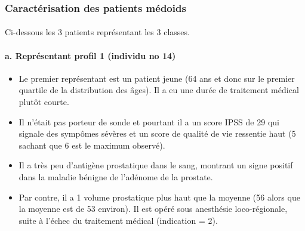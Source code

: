 \documentclass[11pt]{article}
\providecommand{\tightlist}{%
      \setlength{\itemsep}{0pt}\setlength{\parskip}{0pt}}
\begin{document}
    
    \subsubsection{Caractérisation des patients
médoids}\label{caractuxe9risation-des-patients-muxe9doids}

\paragraph{}
Ci-dessous les 3 patients représentant les 3 classes.

\paragraph{}


    
    \paragraph{a. Représentant profil 1 (individu no
14)}\label{a.-repruxe9sentant-profil-1-individu-no-14}

\begin{itemize}
\tightlist
\item
Le premier représentant est un patient jeune (64 ans et donc sur le
premier quartile de la distribution des âges). Il a eu une durée de
traitement médical plutôt courte.
\item
Il n'était pas porteur de sonde et pourtant il a un score IPSS de 29 qui
signale des sympômes sévères et un score de qualité de vie ressentie
haut (5 sachant que 6 est le maximum observé).
\item
Il a très peu d'antigène prostatique dans le sang, montrant un signe
positif dans la maladie bénigne de l'adénome de la prostate.
\item
Par contre, il a 1 volume prostatique plus haut que la moyenne (56 alors
que la moyenne est de 53 environ). Il est opéré sous anesthésie
loco-régionale, suite à l'échec du traitement médical (indication = 2).
\end{itemize}
\end{document}
